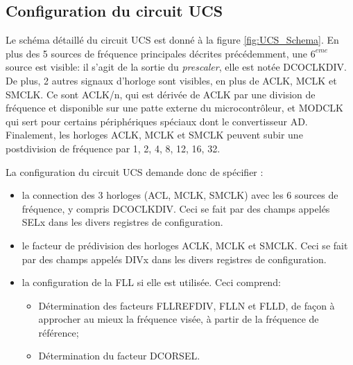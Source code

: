 \subsection{Configuration du circuit UCS}
Le schéma détaillé du circuit UCS est donné à la figure \ref{fig:UCS_Schema}. En plus des 5 sources de fréquence principales décrites précédemment, une $6^{eme}$ source est visible: il s'agit de la sortie du \textit{prescaler}, elle est notée DCOCLKDIV. De plus, 2 autres signaux d'horloge sont visibles, en plus de ACLK, MCLK et SMCLK. Ce sont ACLK/n, qui est dérivée de ACLK par une division de fréquence et disponible sur une patte externe du microcontrôleur, et MODCLK qui sert pour certains périphériques spéciaux dont le convertisseur AD. Finalement, les horloges ACLK, MCLK et SMCLK peuvent subir une postdivision de fréquence par 1, 2, 4, 8, 12, 16, 32.

La configuration du circuit UCS demande donc de spécifier :
\begin{itemize}[label=\textbullet,font=\small]
\item la connection des 3 horloges (ACL, MCLK, SMCLK) avec les 6 sources de fréquence, y compris DCOCLKDIV. Ceci se fait par des champs appelés SELx dans les divers registres de configuration.
\item le facteur de prédivision des horloges ACLK, MCLK et SMCLK. Ceci se fait par des champs appelés DIVx dans les divers registres de configuration.
\item la configuration de la FLL si elle est utilisée. Ceci comprend:
\begin{itemize}[label=\textbullet,font=\footnotesize]
\item Détermination des facteurs FLLREFDIV, FLLN et FLLD, de façon à approcher au mieux la fréquence visée, à partir de la fréquence de référence;
\item Détermination du facteur DCORSEL.
\end{itemize}
\end{itemize}

